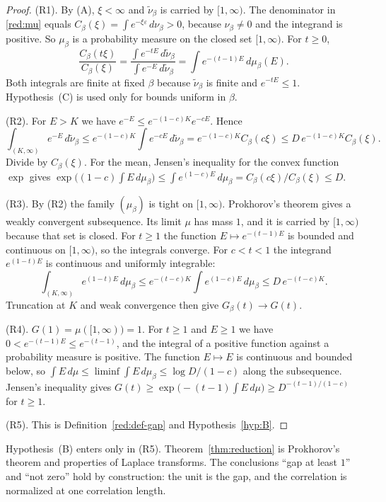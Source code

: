 \begin{proof}
(R1). By (A), $\xi<\infty$ and $\tilde\nu_\beta$ is carried by $[1,\infty)$. The denominator in \eqref{red:mu} equals $C_\beta(\xi)=\int e^{-\xi\varepsilon}\,d\nu_\beta>0$, because $\nu_\beta\ne0$ and the integrand is positive. So $\mu_\beta$ is a probability measure on the closed set $[1,\infty)$. For $t\ge0$,
\[
  \frac{C_\beta(t\xi)}{C_\beta(\xi)}=\frac{\int e^{-tE}\,d\tilde\nu_\beta}{\int e^{-E}\,d\tilde\nu_\beta}=\int e^{-(t-1)E}\,d\mu_\beta(E).
\]
Both integrals are finite at fixed $\beta$ because $\tilde\nu_\beta$ is finite and $e^{-tE}\le1$. Hypothesis~(C) is used only for bounds uniform in $\beta$.

(R2). For $E>K$ we have $e^{-E}\le e^{-(1-c)K}e^{-cE}$. Hence
\[
  \int_{(K,\infty)}e^{-E}\,d\tilde\nu_\beta\le e^{-(1-c)K}\int e^{-cE}\,d\tilde\nu_\beta=e^{-(1-c)K}C_\beta(c\xi)\le D\,e^{-(1-c)K}C_\beta(\xi).
\]
Divide by $C_\beta(\xi)$. For the mean, Jensen's inequality for the convex function $\exp$ gives $\exp\bigl((1-c)\int E\,d\mu_\beta\bigr)\le\int e^{(1-c)E}\,d\mu_\beta=C_\beta(c\xi)/C_\beta(\xi)\le D$.

(R3). By (R2) the family $(\mu_\beta)$ is tight on $[1,\infty)$. Prokhorov's theorem gives a weakly convergent subsequence. Its limit $\mu$ has mass $1$, and it is carried by $[1,\infty)$ because that set is closed. For $t\ge1$ the function $E\mapsto e^{-(t-1)E}$ is bounded and continuous on $[1,\infty)$, so the integrals converge. For $c<t<1$ the integrand $e^{(1-t)E}$ is continuous and uniformly integrable:
\[
  \int_{(K,\infty)}e^{(1-t)E}\,d\mu_\beta\le e^{-(t-c)K}\int e^{(1-c)E}\,d\mu_\beta\le D\,e^{-(t-c)K}.
\]
Truncation at $K$ and weak convergence then give $G_\beta(t)\to G(t)$.

(R4). $G(1)=\mu([1,\infty))=1$. For $t\ge1$ and $E\ge1$ we have $0<e^{-(t-1)E}\le e^{-(t-1)}$, and the integral of a positive function against a probability measure is positive. The function $E\mapsto E$ is continuous and bounded below, so $\int E\,d\mu\le\liminf\int E\,d\mu_\beta\le\log D/(1-c)$ along the subsequence. Jensen's inequality gives $G(t)\ge\exp\bigl(-(t-1)\int E\,d\mu\bigr)\ge D^{-(t-1)/(1-c)}$ for $t\ge1$.

(R5). This is Definition~\ref{red:def-gap} and Hypothesis~\ref{hyp:B}.
\end{proof}

Hypothesis~(B) enters only in (R5). Theorem~\ref{thm:reduction} is Prokhorov's theorem and properties of Laplace transforms. The conclusions ``gap at least $1$'' and ``not zero'' hold by construction: the unit is the gap, and the correlation is normalized at one correlation length.

